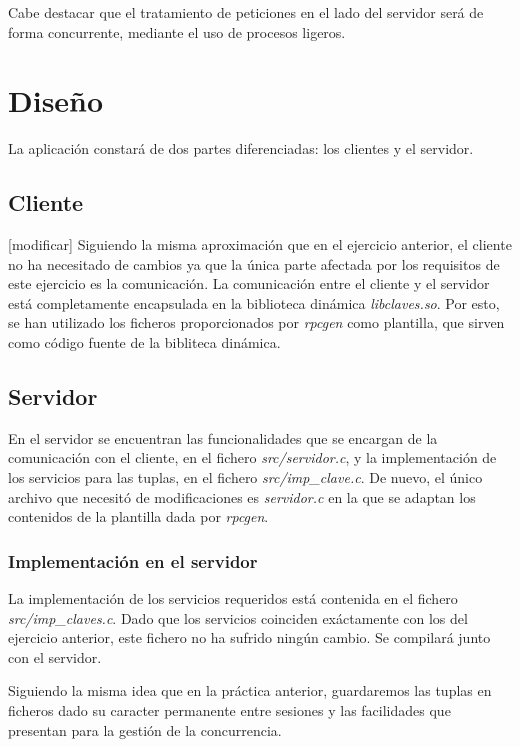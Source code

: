 \documentclass[]{article}
\begin{document}
Cabe destacar que el tratamiento de peticiones en el lado del servidor será de forma concurrente, mediante el uso de procesos ligeros. 

\section{Diseño}
\label{sec:disenno}
La aplicación constará de dos partes diferenciadas: los clientes y el servidor.

\subsection{Cliente}
\label{subsec:cliente}
[modificar]
Siguiendo la misma aproximación que en el ejercicio anterior, el cliente no ha necesitado de cambios ya que la única parte afectada por los requisitos de este ejercicio es la comunicación. La comunicación entre el cliente y el servidor está completamente encapsulada en la biblioteca dinámica \textit{libclaves.so}. Por esto, se han utilizado los ficheros proporcionados por \textit{rpcgen} como plantilla, que sirven como código fuente de la bibliteca dinámica.

\subsection{Servidor}
\label{subsec:servidor}
En el servidor se encuentran las funcionalidades que se encargan de la comunicación con el cliente, en el fichero \textit{src/servidor.c}, y la implementación de los servicios para las tuplas, en el fichero \textit{src/imp\_clave.c}. De nuevo, el único archivo que necesitó de modificaciones es \textit{servidor.c} en la que se adaptan los contenidos de la plantilla dada por \textit{rpcgen}. 

\subsubsection{Implementación en el servidor}
\label{subsec:implementacion_servidor}

La implementación de los servicios requeridos está contenida en el fichero \textit{src/imp\_claves.c}. Dado que los servicios coinciden exáctamente con los del ejercicio anterior, este fichero no ha sufrido ningún cambio. Se compilará junto con el servidor. 

Siguiendo la misma idea que en la práctica anterior, guardaremos las tuplas en ficheros dado su caracter permanente entre sesiones y las facilidades que presentan para la gestión de la concurrencia.
\end{document}
